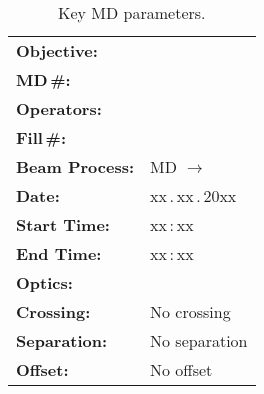 \begin{table}[h]
\small
\centering
\caption[]{Key MD parameters.}
\label{tab:keyMDParameters}
\begin{tabular}{@{}ll@{}}
\toprule
\textbf{Objective:}    & \\
\textbf{MD\,\#:}       &  \\
\textbf{Operators:}    &  \\
\midrule
\textbf{Fill\,\#:}     &  \\
\textbf{Beam Process:} & MD $\rightarrow$ {\footnotesize }\\ 
\textbf{Date:}         & xx\,.\,xx\,.\,20xx                                        \\
\textbf{Start Time:}   & xx\,:\,xx                                                 \\
\textbf{End Time:}     & xx\,:\,xx                                                 \\
\textbf{Optics:}       & \\ 
\textbf{Crossing:}     & No crossing \\
\textbf{Separation:}     & No separation \\
\textbf{Offset:}       & No offset \\
\bottomrule
\end{tabular}
\vspace{0.5cm}
\end{table}



